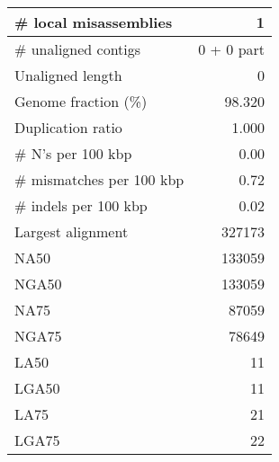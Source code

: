 \documentclass[12pt,a4paper]{article}
\begin{document}
\begin{table}[ht]
\begin{center}
\begin{tabular}{|l*{1}{|r}|}
\# local misassemblies & 1 \\ \hline
\# unaligned contigs & 0 + 0 part \\ \hline
Unaligned length & 0 \\ \hline
Genome fraction (\%) & 98.320 \\ \hline
Duplication ratio & 1.000 \\ \hline
\# N's per 100 kbp & 0.00 \\ \hline
\# mismatches per 100 kbp & 0.72 \\ \hline
\# indels per 100 kbp & 0.02 \\ \hline
Largest alignment & 327173 \\ \hline
NA50 & 133059 \\ \hline
NGA50 & 133059 \\ \hline
NA75 & 87059 \\ \hline
NGA75 & 78649 \\ \hline
LA50 & 11 \\ \hline
LGA50 & 11 \\ \hline
LA75 & 21 \\ \hline
LGA75 & 22 \\ \hline
\end{tabular}
\end{center}
\end{table}
\end{document}
